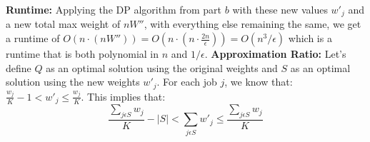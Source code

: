 \documentclass[oneside]{homework} %
\begin{document}
\textbf{Runtime:} 
\newline
Applying the DP algorithm from part $b$ with these new values $w'_j$ and a new total max weight of $nW''$, with everything else remaining the same, we get a runtime of $O(n\cdot(nW'')) = O(n\cdot(n\cdot\frac{2n}{\epsilon})) = O(n^3/\epsilon)$ which is a runtime that is both polynomial in $n$ and $1/\epsilon$.
\newline
\newline
\textbf{Approximation Ratio:} 
\newline
Let's define $Q$ as an optimal solution using the original weights and $S$ as an optimal solution using the new weights $w'_j$.
\newline
For each job $j$, we know that: $\frac{w_j}{K} - 1 < w'_j \leq \frac{w_j}{K}$. This implies that: $$\frac{\sum\limits_{j\epsilon S}w_j}{K} - |S| < \sum\limits_{j\epsilon S}w'_j \leq \frac{\sum\limits_{j\epsilon S}w_j}{K}$$
\newline 
\end{document}

